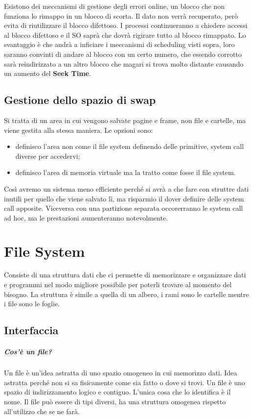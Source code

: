 \documentclass[a4paper, 12pt]{book}
\begin{document}
Esistono dei meccanismi di gestione degli errori online, 
un blocco che non funziona lo rimappo in un blocco di scorta.
Il dato non verrà recuperato, però evita di riutilizzare 
il blocco difettoso. I processi continueranno a chiedere 
accessi al blocco difettoso e il SO saprà che dovrà rigirare
tutto al blocco rimappato. Lo svantaggio è che andrà a inficiare 
i meccanismi di scheduling visti sopra, loro saranno convinti 
di andare al blocco con un certo numero, che essendo 
corrotto sarà reindirizzato a un altro blocco che magari si 
trova molto distante causando un aumento del \textbf{Seek Time}.

\section{Gestione dello spazio di swap}

Si tratta di un area in cui vengono salvate pagine e 
frame, non file e cartelle, ma viene gestita alla 
stessa maniera. Le opzioni sono:
\begin{itemize}
    \item definisco l'area non come il file system definendo delle primitive, system call diverse per accedervi;
    \item definisco l'area di memoria virtuale ma la tratto come fosse il file system.
\end{itemize}
Così avremo un sistema meno efficiente perché si avrà a 
che fare con struttre dati inutili per quello che viene 
salvato lì, ma risparmio il dover definire delle 
system call apposite. Viceversa con una partizione 
separata occorerranno le system call ad hoc, ma le 
prestazioni aumenteranno notevolmente.

\chapter{File System}

Consiste di una struttura dati che ci permette di memorizzare 
e organizzare dati e programmi nel modo migliore possibile 
per poterli trovare al momento del bisogno. La struttura 
è simile a quella di un albero, i rami sono le cartelle 
mentre i file sono le foglie.

\section{Interfaccia}

\paragraph{Cos'è un file?} Un file è un'idea astratta 
di uno spazio omogeneo in cui memorizzo dati. Idea 
astratta perché non si sa fisicamente come sia fatto 
o dove si trovi. Un file è uno spazio di indirizzamento 
logico e contiguo. L'unica cosa che lo identifica è 
il nome. Il file può essere di tipi diversi, ha una 
struttura omogenea rispetto all'utilizzo che se ne farà.
\end{document}
